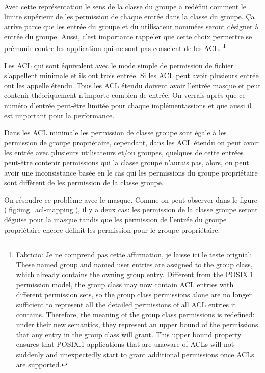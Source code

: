 Avec cette représentation le sens de la classe du groupe a redéfini comment le limite supérieur de les permission de chaque entrée dans la classe du groupe. Ça arrive parce que les entrée du groupe et du utilisateur nommées seront désigner à entrée du groupe. Aussi, c'est importante rappeler que cette choix permettre se prémunir contre les application qui ne sont pas conscient de les ACL.
\footnote{Fabricio: Je ne comprend pas cette affirmation, je laisse ici le teste orignial: 
These named group and named user entries are assigned to the group class, which already contains the owning group entry. Different from the POSIX.1 permission model, the group class may now contain ACL entries with different permission sets, so the group class permissions alone are no longer sufficient to represent all the detailed permissions of all ACL entries it contains. Therefore, the meaning of the group class permissions is redefined: under their new semantics, they represent an upper bound of the permissions that any entry in the group class will grant. This upper bound property ensures that POSIX.1 applications that are unaware of ACLs will not suddenly and unexpectedly start to grant additional permissions once ACLs are supported.}.

Les ACL qui sont équivalent avec le mode simple de permission de fichier s'appellent minimale et ils ont trois entrée. Si les ACL peut avoir plusieurs entrée ont les appelle étendu. Tous les ACL étendu doivent avoir l'entrée masque et peut contenir théoriquement n'importe combien de entrée. On verrais après que ce numéro d'entrée peut-être limitée pour chaque implémentassions et que aussi il est important pour la performance.

Dans les ACL minimale les permission de classe groupe sont égale à les permission de groupe propriétaire, cependant, dans les ACL étendu on peut avoir les entrée avec plusieurs utilisateurs et/ou groupes, quelques de cette entrées peut-être contenir permissions qui la classe groupe n'aurais pas, alors, on peut avoir une inconsistance basée en le cas qui les permissions du groupe propriétaire sont diffèrent de les permission de la classe groupe. 

On résoudre ce problème avec le masque. Comme on peut observer dans le figure (\ref{fig:img_acl-mapping}), il y a deux cas: les permission de la classe groupe seront déguise pour la masque tandis que les permission de l'entrée du groupe propriétaire encore définit les permission pour le groupe propriétaire.    



